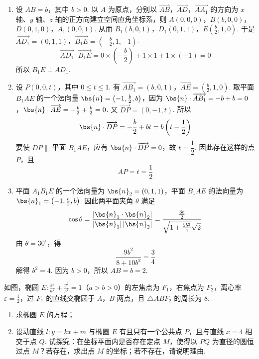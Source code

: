 \begin{solution}
\begin{enumerate}
\item 设 \(AB=b\)，其中 \(b>0\). 以 \(A\) 为原点，分别以 \(\overrightarrow{AB}\)，\(\overrightarrow{AD}\)，\(\overrightarrow{AA_{1}}\) 的方向为 \(x\) 轴、\(y\) 轴、\(z\) 轴的正方向建立空间直角坐标系，则 \(A(0,0,0)\)，\(B(b,0,0)\)，\(D(0,1,0)\)，\(A_{1}(0,0,1)\).
从而
\(B_{1}(b,0,1)\)，\(D_{1}(0,1,1)\)，\(E\left(\frac{b}{2},1,0\right)\).
于是 \(\overrightarrow{AD_{1}}=(0,1,1)\)，\(\overrightarrow{B_{1}E}=\left(-\frac{b}{2},1,-1\right)\).
\[
\overrightarrow{AD_{1}}\cdot\overrightarrow{B_{1}E}
=0\times\left(-\frac{b}{2}\right)+1\times1+1\times(-1)=0
\]
所以 \(B_{1}E\perp AD_{1}\).

\item 设 \(P(0,0,t)\)，其中 \(0\leqslant t\leqslant1\). 有 \(\overrightarrow{AB_{1}}=(b,0,1)\)，\(\overrightarrow{AE}=\left(\frac{b}{2},1,0\right)\).
取平面 \(B_{1}AE\) 的一个法向量 \(\bs{n}=\left(-1,\frac{b}{2},b\right)\)，因为 \(\bs{n}\cdot\overrightarrow{AB_{1}}=-b+b=0\)，\(\bs{n}\cdot\overrightarrow{AE}=-\frac{b}{2}+\frac{b}{2}=0\).
又 \(\overrightarrow{DP}=(0,-1,t)\).
所以
\[
\bs{n}\cdot\overrightarrow{DP}
=-\frac{b}{2}+bt=b\left(t-\frac{1}{2}\right)
\]
要使 \(DP\parallel\) 平面 \(B_{1}AE\)，应有 \(\bs{n}\cdot\overrightarrow{DP}=0\)，故 \(t=\dfrac{1}{2}\). 因此存在这样的点 \(P\)，且
\[
AP=t=\frac{1}{2}
\]

\item 平面 \(A_{1}B_{1}E\) 的一个法向量为 \(\bs{n}_{2}=(0,1,1)\)，平面 \(B_{1}AE\) 的法向量为 \(\bs{n}_{1}=\left(-1,\frac{b}{2},b\right)\). 因此两平面夹角 \(\theta\) 满足
\[
\cos\theta
=\frac{|\bs{n}_{1}\cdot\bs{n}_{2}|}{|\bs{n}_{1}|\,|\bs{n}_{2}|}
=\frac{\frac{3b}{2}}{\sqrt{1+\frac{5b^{2}}{4}}\sqrt{2}}
\]
由 \(\theta=30^{\circ}\)，得
\[
\frac{9b^{2}}{8+10b^{2}}=\frac{3}{4}
\]
解得 \(b^{2}=4\). 因为 \(b>0\)，所以 \(AB=b=2\).
\end{enumerate}
\end{solution}

\begin{problem}
如图，椭圆 \(E: \frac{x^{2}}{a^{2}} + \frac{y^{2}}{b^{2}} = 1\)（\(a > b > 0\)）的左焦点为 \(F_{1}\)，右焦点为 \(F_{2}\)，离心率 \(\varepsilon = \frac{1}{2}\)，过 \(F_{1}\) 的直线交椭圆于 \(A\)，\(B\) 两点，且 \(\triangle ABF_{2}\) 的周长为 \(8\).

\begin{enumerate}
\item 求椭圆 \(E\) 的方程；
\item 设动直线 \(l: y = kx + m\) 与椭圆 \(E\) 有且只有一个公共点 \(P\)，且与直线 \(x = 4\) 相交于点 \(Q\). 试探究：在坐标平面内是否存在定点 \(M\)，使得以 \(PQ\) 为直径的圆恒过点 \(M\)？若存在，求出点 \(M\) 的坐标；若不存在，请说明理由.
\end{enumerate}

\begin{center}
\end{center}
\end{problem}


